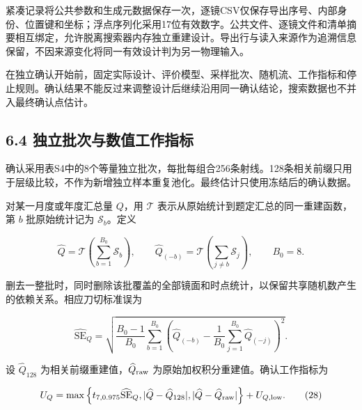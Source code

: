 \documentclass[UTF8,fontset=windows,zihao=-4]{ctexart}
\begin{document}
紧凑记录将公共参数和生成元数据保存一次，逐镜CSV仅保存导出序号、内部身份、位置键和坐标；浮点序列化采用17位有效数字。公共文件、逐镜文件和清单摘要相互绑定，允许脱离搜索器内存独立重建设计。导出行与读入来源作为追溯信息保留，不因来源变化将同一有效设计判为另一物理输入。

在独立确认开始前，固定实际设计、评价模型、采样批次、随机流、工作指标和停止规则。确认结果不能反过来调整设计后继续沿用同一确认结论，搜索数据也不并入最终确认点估计。

\subsection*{6.4 独立批次与数值工作指标}

确认采用表S4中的8个等量独立批次，每批每组合256条射线。128条相关前缀只用于层级比较，不作为新增独立样本重复池化。最终估计只使用冻结后的确认数据。

\par\noindent\begin{minipage}{\linewidth}
对某一月度或年度汇总量 \(Q\)，用 \(\mathcal T\) 表示从原始统计到题定汇总的同一重建函数，第 \(b\) 批原始统计记为 \(\mathcal S_b\)。定义

\[
\widehat Q=\mathcal T\!\left(\sum_{b=1}^{B_0}\mathcal S_b\right),
\qquad
\widehat Q_{(-b)}=\mathcal T\!\left(\sum_{j\ne b}\mathcal S_j\right),
\qquad B_0=8.
\tag{26}
\]
\end{minipage}\par

\par\noindent\begin{minipage}{\linewidth}
删去一整批时，同时删除该批覆盖的全部镜面和时点统计，以保留共享随机数产生的依赖关系。相应刀切标准误为

\[
\widehat{\mathrm{SE}}_Q=
\sqrt{\frac{B_0-1}{B_0}\sum_{b=1}^{B_0}
\left(\widehat Q_{(-b)}-\frac1{B_0}\sum_{j=1}^{B_0}\widehat Q_{(-j)}\right)^2}.
\tag{27}
\]
\end{minipage}\par

\par\noindent\begin{minipage}{\linewidth}
设 \(\widehat Q_{128}\) 为相关前缀重建值，\(\widehat Q_{\rm raw}\) 为原始加权积分重建值。确认工作指标为

\[
U_Q=
\max\left\{
t_{7,0.975}\widehat{\mathrm{SE}}_Q,
|\widehat Q-\widehat Q_{128}|,
|\widehat Q-\widehat Q_{\rm raw}|
\right\}+U_{Q,\rm low}.
\tag{28}
\]
\end{minipage}\par
\end{document}

